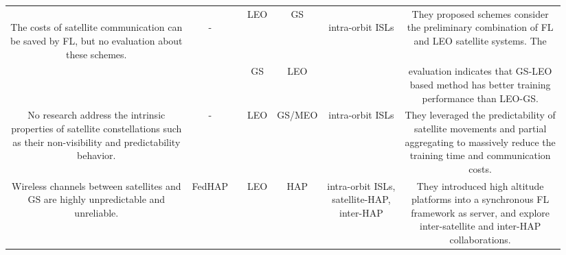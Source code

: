 \documentclass[lettersize,journal]{IEEEtran}
\begin{document}
\begin{table*}[htbp]
\begin{tabular}{|c|c|c|c|c|c|c|}
  \multirowcell{2}[0pt][l]{\vspace{-0.1cm} \\ The costs of satellite communication can\\ be saved by FL, but no evaluation about\\ these schemes.}  & \multirowcell{2}{\vspace{0.2cm} \\- } & \multirowcell{2}{\vspace{0.2cm} \\ \cite{RN225}} &  LEO & GS &  \multirowcell{2}[0pt][c]{\vspace{0.2cm} \\ intra-orbit ISLs} & \makecell[l]{They proposed schemes consider \\the preliminary combination of FL \\ and LEO satellite systems. The }   \\ \cline{4-5} 
 & & & GS & LEO & &  \makecell[l]{evaluation indicates that GS-LEO \\ based method has better training\\ performance than LEO-GS.}\\ \hline

  \makecell[l]{No research address the intrinsic \\properties of satellite constellations such\\ as their  non-visibility and predictability \\behavior.} & -  & \cite{RN217} &  LEO & GS/MEO & intra-orbit ISLs& \makecell[l]{They leveraged the predictability of \\satellite movements and partial\\ aggregating to massively reduce the \\ training time and communication\\ costs.}   \\ \hline  

  \makecell[l]{Wireless channels between satellites and\\ GS are highly unpredictable and \\unreliable.} & FedHAP  & \cite{RN212} &  LEO & HAP & \makecell[c]{intra-orbit ISLs, \\satellite-HAP, \\inter-HAP}& \makecell[l]{They introduced high altitude \\platforms into  a synchronous FL \\framework as server, and explore \\inter-satellite and inter-HAP \\collaborations.}   \\ \hline  


\end{tabular}
\end{table*}
\end{document}
